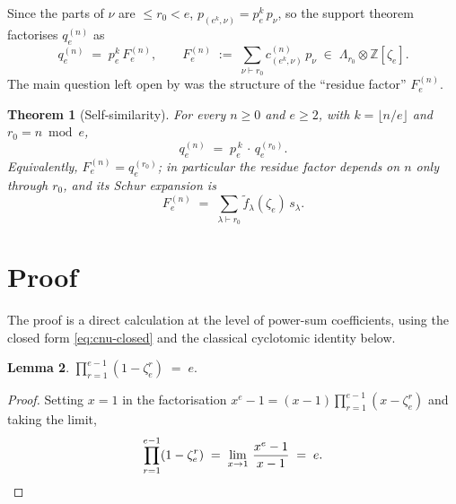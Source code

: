 \documentclass[11pt]{article}
\newtheorem{theorem}{Theorem}
\newtheorem{lemma}[theorem]{Lemma}
\theoremstyle{remark}
\newcommand{\ftilde}{\widetilde{f}}
\newcommand{\qe}{q_e}
\newcommand{\zetae}{\zeta_e}
\newcommand{\ZZ}{\mathbb{Z}}
\begin{document}
Since the parts of $\nu$ are $\le r_0 < e$, $p_{(e^k, \nu)} = p_e^{k}\, p_\nu$, so the support theorem factorises $\qe^{(n)}$ as
\[
  \qe^{(n)} \;=\; p_e^{k}\, F_e^{(n)}, \qquad F_e^{(n)} \;:=\; \sum_{\nu \vdash r_0} c_{(e^k, \nu)}^{(n)}\, p_\nu \;\in\; \Lambda_{r_0} \otimes \ZZ[\zetae].
\]
The main question left open by \cite{Cli26-support} was the structure of the ``residue factor'' $F_e^{(n)}$.

\begin{theorem}[Self-similarity]\label{thm:self-sim}
For every $n \ge 0$ and $e \ge 2$, with $k = \lfloor n/e\rfloor$ and $r_0 = n \bmod e$,
\[
  \qe^{(n)} \;=\; p_e^{\,k}\, \cdot\, \qe^{(r_0)}.
\]
Equivalently, $F_e^{(n)} = \qe^{(r_0)}$; in particular the residue factor depends on $n$ only through $r_0$, and its Schur expansion is
\[
  F_e^{(n)} \;=\; \sum_{\lambda \vdash r_0} \ftilde_\lambda(\zetae)\, s_\lambda.
\]
\end{theorem}

\section{Proof}

The proof is a direct calculation at the level of power-sum coefficients, using the closed form \eqref{eq:cnu-closed} and the classical cyclotomic identity below.

\begin{lemma}\label{lem:cyclo}
$\displaystyle \prod_{r=1}^{e-1} (1 - \zetae^r) \;=\; e.$
\end{lemma}

\begin{proof}
Setting $x = 1$ in the factorisation $x^{e} - 1 = (x - 1)\prod_{r=1}^{e-1}(x - \zetae^r)$ and taking the limit,
\[
  \prod_{r=1}^{e-1}(1 - \zetae^r) \;=\; \lim_{x \to 1}\, \frac{x^e - 1}{x - 1} \;=\; e. \qedhere
\]
\end{proof}
\end{document}
